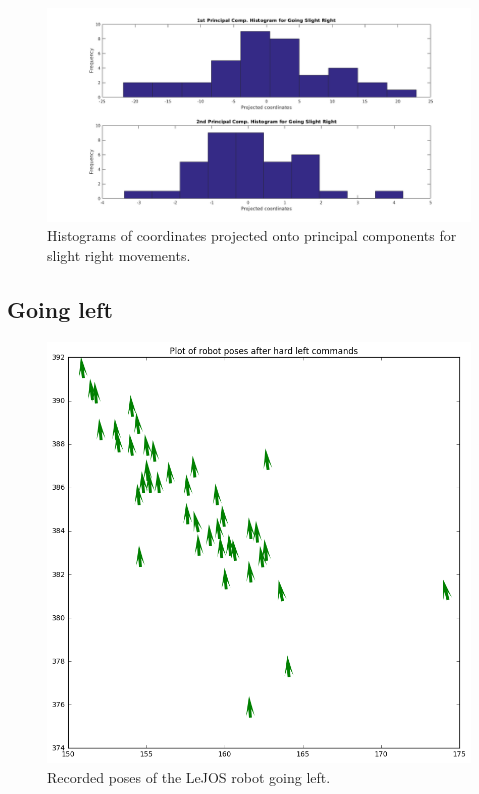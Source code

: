 \documentclass[paper=a4, fontsize=11pt]{scrartcl} %
\begin{document}
    \begin{figure}[h!]
        \begin{center}
            \setlength{\fboxsep}{0.5pt} %
            \setlength{\fboxrule}{0.5pt}
            \includegraphics[width=\linewidth,fbox]{images/pca_histogram_slightRight.png}
            \caption{Histograms of coordinates projected onto principal components for slight right movements.}
        \end{center}
    \end{figure}

    \newpage
    \subsection{Going left}
    \begin{figure}[h!]
        \begin{center}
            \setlength{\fboxsep}{0.5pt} %
            \setlength{\fboxrule}{0.5pt}
            \includegraphics[width=12cm,fbox]{images/poses_plot_4_left.png}
            \caption{Recorded poses of the LeJOS robot going left.}
        \end{center}
    \end{figure}
\end{document}
